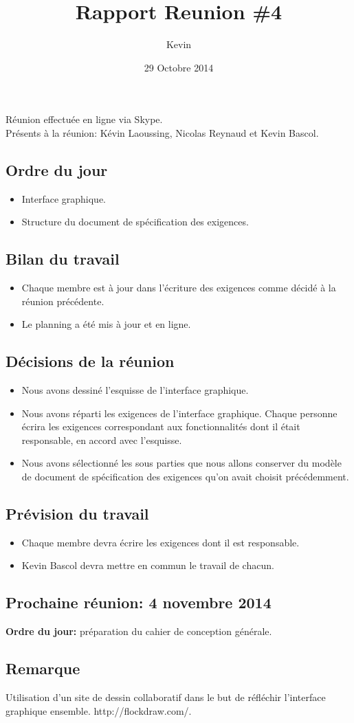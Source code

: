 \documentclass{article}
\title{Rapport Reunion \#4}
\author{Kevin \bsc{Bascol}}
\date{29 Octobre 2014}
\begin{document}
\maketitle
\newpage

Réunion effectuée en ligne via Skype.\\
Présents à la réunion: Kévin Laoussing, Nicolas Reynaud et Kevin Bascol.

\subsection*{Ordre du jour}
	\begin{itemize}
		\item Interface graphique.
		\item Structure du document de spécification des exigences.
	\end{itemize}

\subsection*{Bilan du travail}
	\begin{itemize}
		\item Chaque membre est à jour dans l'écriture des exigences comme décidé à la réunion précédente.
		\item Le planning a été mis à jour et en ligne.
	\end{itemize}
	
\subsection*{Décisions de la réunion}
	\begin{itemize}
		\item Nous avons dessiné l'esquisse de l'interface graphique.
		\item Nous avons réparti les exigences de l'interface graphique. Chaque personne écrira les exigences correspondant aux fonctionnalités dont il était responsable, en accord avec l'esquisse.
		\item Nous avons sélectionné les sous parties que nous allons conserver du modèle de document de spécification des exigences qu'on avait choisit précédemment.
	\end{itemize}
	
\subsection*{Prévision du travail}
	\begin{itemize}
		\item Chaque membre devra écrire les exigences dont il est responsable.
		\item Kevin Bascol devra mettre en commun le travail de chacun.
	\end{itemize}
	
\subsection*{Prochaine réunion: 4 novembre 2014}
	\textbf{Ordre du jour:} préparation du cahier de conception générale.
	
\subsection*{Remarque}
Utilisation d'un site de dessin collaboratif dans le but de réfléchir l'interface graphique ensemble. http://flockdraw.com/.
\end{document}
